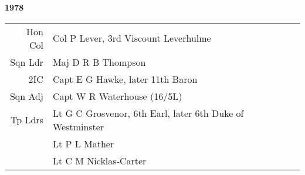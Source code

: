 \begin{center}
  \Huge
  \textbf{1978}
\end{center}

\begin{center}
  \small
  \begin{tabular}{rl}
    Hon Col & Col P Lever, 3rd Viscount Leverhulme \\
    Sqn Ldr & Maj D R B Thompson \\
    2IC & Capt E G Hawke, later 11th Baron \\
    Sqn Adj & Capt W R Waterhouse (16/5L) \\
    Tp Ldrs & Lt G C Grosvenor, 6th Earl, later 6th Duke of Westminster \\
      & Lt P L Mather \\
      & Lt C M Nicklas-Carter \\
  \end{tabular}
\end{center}

